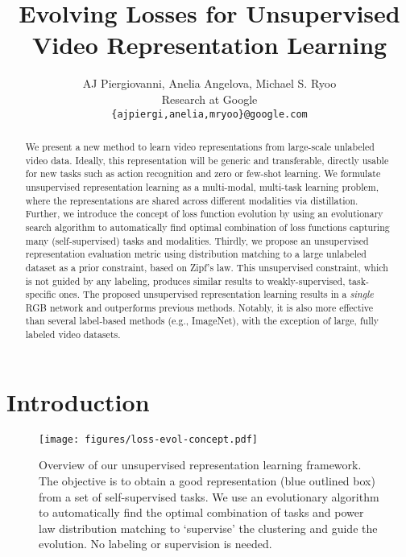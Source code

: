 \documentclass[10pt,twocolumn,letterpaper]{article}
\begin{document}
\title{Evolving Losses for Unsupervised Video Representation Learning}

\author{AJ Piergiovanni, Anelia Angelova, Michael S. Ryoo\\
Research at Google \\
\texttt{\{ajpiergi,anelia,mryoo\}@google.com}\\}

\maketitle


\begin{abstract}
We present a new method to learn video representations from large-scale unlabeled video data. Ideally, this representation will be generic and transferable, directly usable for new tasks such as action recognition and zero or few-shot learning. We formulate unsupervised representation learning as a multi-modal, multi-task learning problem, where the representations are shared across different modalities via distillation. Further, we introduce the concept of loss function evolution by using an evolutionary search algorithm to automatically find optimal combination of loss functions capturing many (self-supervised) tasks and modalities. 
Thirdly, we propose an unsupervised representation evaluation metric using distribution matching to a large unlabeled dataset as a prior constraint, based on  Zipf's law. This unsupervised constraint, which is not guided by any labeling, produces similar results to weakly-supervised, task-specific ones. 
The proposed unsupervised representation learning results in a \emph{single} RGB network and outperforms previous methods. Notably, it is also more effective than several label-based methods (e.g., ImageNet), with the exception of large, fully labeled video datasets.





\end{abstract}

\section{Introduction}

\begin{figure}
    \centering
    \texttt{[image: figures/loss-evol-concept.pdf]}
    \caption{
    Overview of our unsupervised representation learning framework. 
    The objective is to obtain a good representation (blue outlined box) from a set of self-supervised tasks. 
We use an evolutionary algorithm to automatically find the optimal combination of tasks and power law distribution matching to `supervise' the clustering and guide the evolution. No labeling or supervision is needed.}
    \label{fig:concept}
\end{figure}
\end{document}
